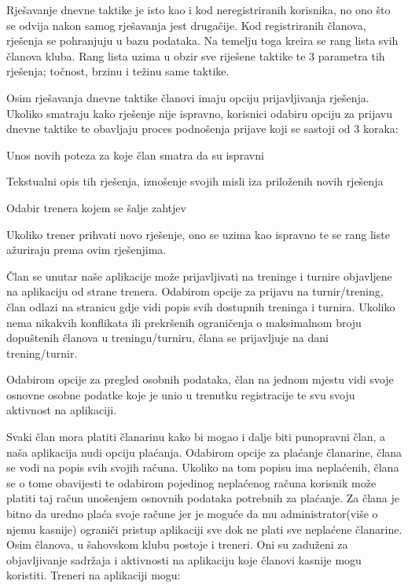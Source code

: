 \documentclass{article}
\begin{document}
		Rješavanje dnevne taktike je isto kao i kod neregistriranih korisnika, no ono što se odvija nakon samog rješavanja jest drugačije. Kod registriranih članova, rješenja se pohranjuju u bazu podataka. Na temelju toga kreira se rang lista svih članova kluba. Rang lista uzima u obzir sve riješene taktike te 3 parametra tih rješenja; točnost, brzinu i težinu same taktike. 
		
		Osim rješavanja dnevne taktike članovi imaju opciju prijavljivanja rješenja. Ukoliko smatraju kako rješenje nije ispravno, korisnici odabiru opciju za prijavu dnevne taktike te obavljaju proces podnošenja prijave koji se sastoji od 3 koraka: 
		\begin{packed_enum}
			\item Unos novih poteza za koje član smatra da su ispravni 
			\item Tekstualni opis tih rješenja, iznošenje svojih misli iza priloženih novih rješenja 
			\item Odabir trenera kojem se šalje zahtjev 
		\end{packed_enum}
		Ukoliko trener prihvati novo rješenje, ono se uzima kao ispravno te se rang liste ažuriraju prema ovim rješenjima.  
		
		Član se unutar naše aplikacije može prijavljivati na treninge i turnire objavljene na aplikaciju od strane trenera. Odabirom opcije za prijavu na turnir/trening, član odlazi na stranicu gdje vidi popis svih dostupnih treninga i turnira. Ukoliko nema nikakvih konflikata ili prekršenih ograničenja o maksimalnom broju dopuštenih članova u treningu/turniru, člana se prijavljuje na dani trening/turnir. 
		
		Odabirom opcije za pregled osobnih podataka, član na jednom mjestu vidi svoje osnovne osobne podatke koje je unio u trenutku registracije te svu svoju aktivnost na aplikaciji. 
		
		Svaki član mora platiti članarinu kako bi mogao i dalje biti punopravni član, a naša aplikacija nudi opciju plaćanja. Odabirom opcije za plaćanje članarine, člana se vodi na popis svih svojih računa. Ukoliko na tom popisu ima neplaćenih, člana se o tome obavijesti te odabirom pojedinog neplaćenog računa korisnik može platiti taj račun unošenjem osnovnih podataka potrebnih za plaćanje. Za člana je bitno da uredno plaća svoje račune jer je moguće da mu administrator(više o njemu kasnije) ograniči pristup aplikaciji sve dok ne plati sve neplaćene članarine.\\ 
		
		
		Osim članova, u šahovskom klubu postoje i treneri. Oni su zaduženi za objavljivanje sadržaja i aktivnosti na aplikaciju koje članovi kasnije mogu koristiti. Treneri na aplikaciji mogu:
		
\end{document}
